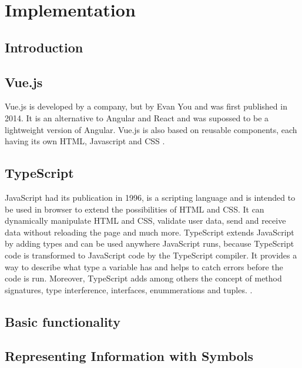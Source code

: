\chapter{Implementation}

\section{Introduction}

\section{Vue.js}

Vue.js is developed by a company, but by Evan You and was first published in 2014. It is an alternative to Angular and React and was supossed to be a lightweight version of Angular. Vue.js is also based on reusable components, each having its own HTML, Javascript and CSS \cite{Vue}.

\section{TypeScript}

JavaScript had its publication in 1996, is a scripting language and is intended to be used in browser to extend the possibilities of HTML and CSS. It can dynamically manipulate HTML and CSS, validate user data, send and receive data without reloading the page and much more.
TypeScript extends JavaScript by adding types and can be used anywhere JavaScript runs, because TypeScript code is transformed to JavaScript code by the TypeScript compiler. It provides a way to describe what type a variable has and helps to catch errors before the code is run. Moreover, TypeScript adds among others the concept of method signatures, type interference, interfaces, enummerations and tuples. \cite{Typescript}.

\section{Basic functionality}


\section{Representing Information with Symbols}

